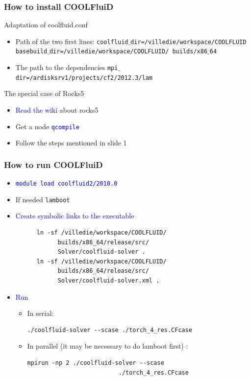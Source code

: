 \documentclass[compress,10pt]{beamer}
\begin{document}
\begin{frame}[fragile]
\frametitle{How to install COOLFluiD}
\begin{block}{Adaptation of coolfluid.conf}
 \begin{itemize}
  \item Path of the two first lines:
\texttt{coolfluid$\_$dir=/villedie/workspace/COOLFLUID}
\texttt{basebuild$\_$dir=/villedie/workspace/COOLFLUID/
\hspace*{6cm}builds/x86$\_$64}
  \item The path to the dependencies
\texttt{mpi$\_$dir=/ardisksrv1/projects/cf2/2012.3/lam}
 \end{itemize}

\end{block}
\begin{block}{The special case of Rocks5}
 \begin{itemize}
  \item \textcolor{blue}{Read the wiki} about rocks5
  \item Get a node \textcolor{blue}{\texttt{qcompile}}
  \item Follow the steps mentioned in slide 1 
 \end{itemize}
\end{block}

\end{frame}

\begin{frame}[fragile]
\frametitle{How to run COOLFluiD}
\begin{block}{}
 \begin{itemize}
  \item \textcolor{blue}{\texttt{module load coolfluid2/2010.0}}
  \item If needed \texttt{lamboot}
  \item \textcolor{blue}{Create symbolic links to the executable}
\begin{verbatim}
      ln -sf /villedie/workspace/COOLFLUID/
            builds/x86_64/release/src/
            Solver/coolfluid-solver .
      ln -sf /villedie/workspace/COOLFLUID/
            builds/x86_64/release/src/
            Solver/coolfluid-solver.xml .
\end{verbatim}
    \item \textcolor{blue}{Run} 
      \begin{itemize}
	\item In serial: 
\begin{verbatim}
./coolfluid-solver --scase ./torch_4_res.CFcase
\end{verbatim}
	\item In parallel (it may be necessary to do lamboot first) : 
\begin{verbatim}
mpirun -np 2 ./coolfluid-solver --scase 
                          ./torch_4_res.CFcase
\end{verbatim}
      \end{itemize}
 \end{itemize}
\end{block}
\end{frame}
\end{document}
